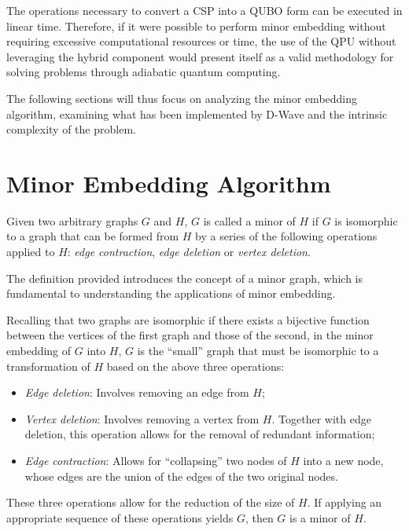 The operations necessary to convert a CSP into a QUBO form can be executed in linear time. Therefore, if it were possible to perform minor embedding without requiring excessive computational resources or time, the use of the QPU without leveraging the hybrid component would present itself as a valid methodology for solving problems through adiabatic quantum computing.

The following sections will thus focus on analyzing the minor embedding algorithm, examining what has been implemented by D-Wave and the intrinsic complexity of the problem.

\section{Minor Embedding Algorithm}

\begin{displayquote}
    Given two arbitrary graphs $G$ and $H$, $G$ is called a minor of $H$ if $G$ is isomorphic to a graph that can be formed from $H$ by a series of the following operations applied to $H$: \emph{edge contraction}, \emph{edge deletion} or \emph{vertex deletion}.
\end{displayquote}

The definition provided introduces the concept of a minor graph, which is fundamental to understanding the applications of minor embedding. 

Recalling that two graphs are isomorphic if there exists a bijective function between the vertices of the first graph and those of the second, in the minor embedding of $G$ into $H$, $G$ is the ``small'' graph that must be isomorphic to a transformation of $H$ based on the above three operations:
\begin{itemize}
    \item \emph{Edge deletion}: Involves removing an edge from $H$;
    \item \emph{Vertex deletion}: Involves removing a vertex from $H$. Together with edge deletion, this operation allows for the removal of redundant information;
    \item \emph{Edge contraction}: Allows for ``collapsing'' two nodes of $H$ into a new node, whose edges are the union of the edges of the two original nodes.
\end{itemize}

These three operations allow for the reduction of the size of $H$. If applying an appropriate sequence of these operations yields $G$, then $G$ is a minor of $H$.

